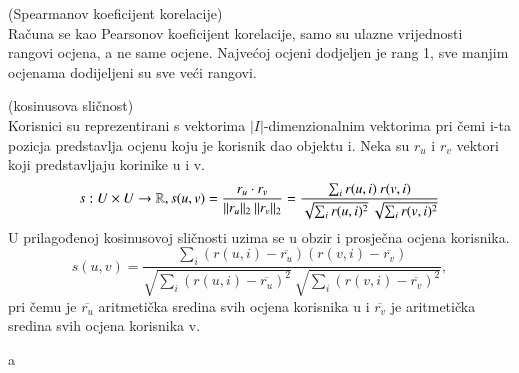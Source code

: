 \documentclass[a4paper,oneside,12pt]{memoir} %
\begin{document}
%
\begin{rem} (Spearmanov koeficijent korelacije)
\\Računa se kao Pearsonov koeficijent korelacije, samo su ulazne vrijednosti rangovi ocjena, a ne same ocjene. Najvećoj ocjeni dodjeljen je rang 1, sve manjim ocjenama dodijeljeni su sve veći rangovi.
\end{rem}
%
\begin{defn} (kosinusova sličnost)
\\Korisnici su reprezentirani s vektorima $|I|$-dimenzionalnim vektorima pri čemi i-ta pozicja predstavlja ocjenu koju je korisnik dao objektu i. Neka su $r_u$ i $r_v$ vektori koji predstavljaju korinike u i v.
\[ s:U\times U \rightarrow \mathbb{R}, s(u,v) = \frac{r_u\cdot r_v}{||r_u||_2 \: ||r_v||_2} = \frac{\sum_i r(u,i)\: r(v,i) }{\sqrt{\sum_i r(u,i)^2}\:\sqrt{\sum_i r(v,i)^2}}  \]
U prilagođenoj kosinusovoj sličnosti uzima se u obzir i prosječna ocjena korisnika.
\[ s(u,v) = \frac{\sum_i (r(u,i)-\overline{r_u})(r(v,i)-\overline{r_v}) }{\sqrt{\sum_i (r(u,i)-\overline{r_u})^2}\:\sqrt{\sum_i (r(v,i)-\overline{r_v})^2}},  \] 
pri čemu je $\overline{r_u}$ aritmetička sredina svih ocjena korisnika u i $\overline{r_v}$ je aritmetička sredina svih ocjena korisnika v.
\end{defn}
\par
a
\end{document}
